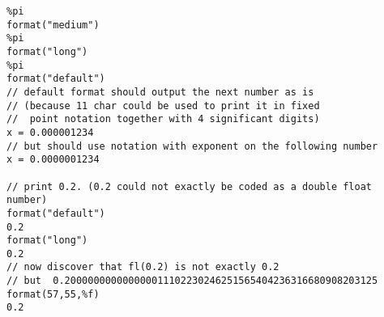
\begin{examples}

\begin{Verbatim}
%pi
format("medium")
%pi
format("long")
%pi
format("default")
// default format should output the next number as is
// (because 11 char could be used to print it in fixed
//  point notation together with 4 significant digits)
x = 0.000001234
// but should use notation with exponent on the following number
x = 0.0000001234

// print 0.2. (0.2 could not exactly be coded as a double float number)
format("default")
0.2
format("long")
0.2
// now discover that fl(0.2) is not exactly 0.2
// but  0.200000000000000011102230246251565404236316680908203125
format(57,55,%f)
0.2
\end{Verbatim}
\end{examples}



